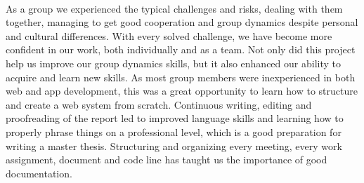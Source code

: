 \paragraph{} As a group we experienced the typical challenges and risks, dealing with them together, managing to get good cooperation and group dynamics despite personal and cultural differences. With every solved challenge, we have become more confident in our work, both individually and as a team. Not only did this project help us improve our group dynamics skills, but it also enhanced our ability to acquire and learn new skills. As most group members were inexperienced in both web and app development, this was a great opportunity to learn how to structure and create a web system from scratch. Continuous writing, editing and proofreading of the report led to improved language skills and learning how to properly phrase things on a professional level, which is a good preparation for writing a master thesis. Structuring and organizing every meeting, every work assignment, document and code line has taught us the importance of good documentation.

